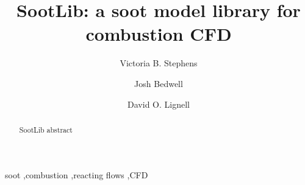 \documentclass[preprint,12pt, a4paper]{elsarticle}
\begin{document}
\begin{frontmatter}



\title{SootLib: a soot model library for combustion CFD}


\author{Victoria B. Stephens}
\author{Josh Bedwell}
\author{David O. Lignell}


\address{Department of Chemical Engineering, Brigham Young University, Provo, UT 84602, United States}

\begin{abstract}
SootLib abstract

\end{abstract}

\begin{keyword}
soot \sep combustion \sep reacting flows \sep CFD
\end{keyword}

\end{frontmatter}
\end{document}
